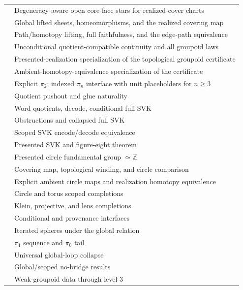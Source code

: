 \documentclass{lmcs}
\theoremstyle{definition}
\theoremstyle{plain}
\theoremstyle{remark}
\newcommand{\piTwo}{\pi_2}
\newcommand{\piN}{\pi_n}
\newcommand{\ZZ}{\mathbb{Z}}
\begin{document}
{\begin{longtable}{@{}L{0.42\textwidth}L{0.50\textwidth}@{}}
 &
Degeneracy-aware open core-face stars for realized-cover charts \\
 &
Global lifted sheets, homeomorphisms, and the realized covering map \\
 &
Path/homotopy lifting, full faithfulness, and the edge-path equivalence \\
 &
Unconditional quotient-compatible continuity and all groupoid laws \\
 &
Presented-realization specialization of the topological groupoid certificate \\
{\scriptsize{}} &
Ambient-homotopy-equivalence specialization of the certificate \\
 & Explicit $\piTwo$; indexed $\piN$ interface with unit placeholders for $n \geq 3$ \\
 & Quotient pushout and glue naturality \\
 & Word quotients, decode, conditional full SVK \\
 & Obstructions and collapsed full SVK \\
 & Scoped SVK encode/decode equivalence \\
 &
Presented SVK and figure-eight theorem \\
 &
Presented circle fundamental group \(\simeq\ZZ\) \\
 &
Covering map, topological winding, and circle comparison \\
 &
Explicit ambient circle maps and realization homotopy equivalence \\
 & Circle and torus scoped completions \\
 & Klein, projective, and lens completions \\
 & Conditional and provenance interfaces \\
 & Iterated spheres under the global relation \\
 & $\pi_1$ sequence and $\pi_0$ tail \\
 & Universal global-loop collapse \\
 & Global/scoped no-bridge results \\
 & Weak-groupoid data through level 3 \\
\end{longtable}
}
\end{document}
